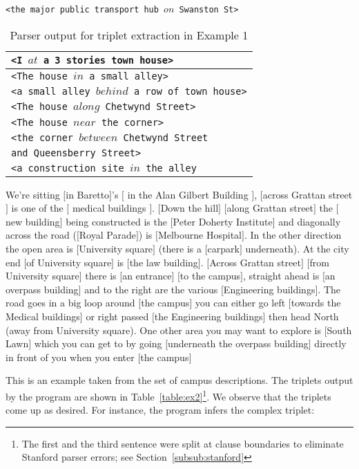 \documentclass[letter]{sig-alternate}
\begin{document}
\texttt{<the major public transport hub $on$ Swanston St>}
\begin{table}
\begin{tabular}{|l|}
\hline
\texttt{<I $at$ a 3 stories town house>}  \\ \hline
\texttt{<The house $in$ a small alley>} \\ \hline
\texttt{<a small alley $behind$ a row of town house>}\\ \hline
\texttt{<The house $along$ Chetwynd Street>}\\ \hline
\texttt{<The house $near$ the corner>}\\ \hline
\texttt{<the corner $between$ Chetwynd Street} \\
\texttt{and Queensberry Street>}\\ \hline
\texttt{<a construction site $in$ the alley}\\ \hline
\end{tabular}
\caption{Parser output for triplet extraction in Example 1}
\label{table:ex1}
\end{table}
\begin{example}
\label{ex:c1}
We're sitting $[$in Baretto$]$'s $[$ in the Alan Gilbert Building $]$, $[$across Grattan street$]$ is one of the $[$ medical buildings $]$. $[$Down the hill$]$ $[$along Grattan street$]$ the $[$new building$]$ being constructed is the $[$Peter Doherty Institute$]$ and diagonally across the road ($[$Royal Parade$]$) is $[$Melbourne Hospital$]$. In the other direction the open area is $[$University square$]$ (there is a $[$carpark$]$ underneath). At the city end $[$of University square$]$ is $[$the law building$]$. $[$Across Grattan street$]$ $[$from University square$]$ there is $[$an entrance$]$ $[$to the campus$]$, straight ahead is $[$an overpass building$]$ and to the right are the various $[$Engineering buildings$]$. The road goes in a big loop around $[$the campus$]$ you can either go left $[$towards the Medical buildings$]$ or right passed $[$the Engineering buildings$]$ then head North (away from University square). One other area you may want to explore is $[$South Lawn$]$ which you can get to by going $[$underneath the overpass building$]$ directly in front of you when you enter $[$the campus$]$ 
\end{example}
This is an example taken from the set of campus descriptions. The triplets output by the program are shown in Table~\ref{table:ex2}\footnote{The first and the third sentence were split at clause boundaries to eliminate Stanford parser errors; see Section~\ref{subsub:stanford}}. We observe that the triplets come up as desired. For instance, the program infers the complex triplet:
\end{document}
